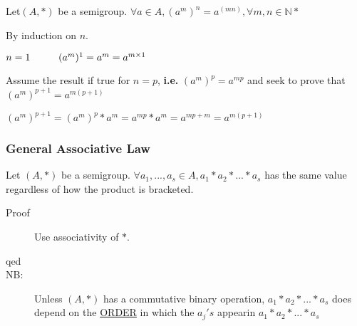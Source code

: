 \documentclass[10pt]{article}
\begin{document}
\begin{description}
\begin{description}
		\end{description}
		\item[Theorem:] Let$(A, *)$ be a semigroup. $\forall a \in A, (a^m)^n = a^(mn), \forall m, n \in \mathbb{N}*$
		\begin{description}
			\item[Proof:] By induction on $n$.
			\item[Base Case:] $n=1 \hspace{10mm} (a^m)^1 = a^m = a^{m \times 1}$
			\item[Inductive Step:] Assume the result if true for $n=p$, \textbf{i.e.} $(a^m)^p = a^{mp}$ and seek to prove that $(a^m)^{p+1}=a^{m(p+1)}$
			\item $(a^m)^{p+1} = (a^m)^p * a^m = a^{mp} * a^m = a^{mp+m} = a^{m(p+1)}$
		\end{description}
	\end{description}
	
	\subsubsection{General Associative Law}
	Let $(A, *)$ be a semigroup. $\forall a_1, ..., a_s \in A, a_1 * a_2 * ... * a_s$ has the same value regardless of how the product is bracketed.
	\begin{description}
		\item[Proof] Use associativity of $*$.
		\item[qed]
		\item[NB:] Unless $(A, *)$ has a commutative binary operation, $a_1 * a_2 * ... * a_s$ does depend on the \underline{ORDER} in which the $a_j's$ appearin $a_1 * a_2 * ... * a_s$
	\end{description}
	
\end{document}
